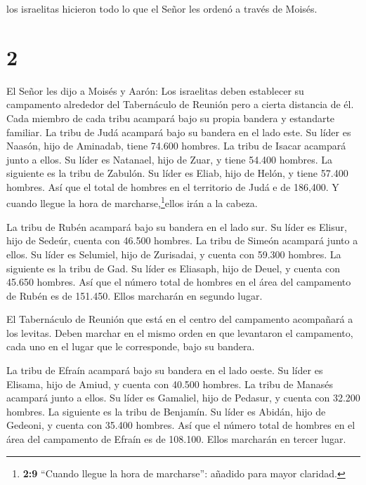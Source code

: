  los israelitas hicieron todo lo que el Señor les ordenó a
través de Moisés.

\hypertarget{section-1}{%
\section{2}\label{section-1}}

 El Señor les dijo a Moisés y Aarón:  Los
israelitas deben establecer su campamento alrededor del Tabernáculo de
Reunión pero a cierta distancia de él. Cada miembro de cada tribu
acampará bajo su propia bandera y estandarte familiar.  La
tribu de Judá acampará bajo su bandera en el lado este. Su líder es
Naasón, hijo de Aminadab,  tiene 74.600 hombres.
 La tribu de Isacar acampará junto a ellos. Su líder es
Natanael, hijo de Zuar,  y tiene 54.400 hombres.
 La siguiente es la tribu de Zabulón. Su líder es Eliab,
hijo de Helón,  y tiene 57.400 hombres.  Así que
el total de hombres en el territorio de Judá e de 186,400. Y cuando
llegue la hora de marcharse,\footnote{\textbf{2:9} ``Cuando llegue la
  hora de marcharse'': añadido para mayor claridad.}ellos irán a la
cabeza.

 La tribu de Rubén acampará bajo su bandera en el lado sur.
Su líder es Elisur, hijo de Sedeúr,  cuenta con 46.500
hombres.  La tribu de Simeón acampará junto a ellos. Su
líder es Selumiel, hijo de Zurisadai,  y cuenta con 59.300
hombres.  La siguiente es la tribu de Gad. Su líder es
Eliasaph, hijo de Deuel,  y cuenta con 45.650 hombres.
 Así que el número total de hombres en el área del
campamento de Rubén es de 151.450. Ellos marcharán en segundo lugar.

 El Tabernáculo de Reunión que está en el centro del
campamento acompañará a los levitas. Deben marchar en el mismo orden en
que levantaron el campamento, cada uno en el lugar que le corresponde,
bajo su bandera.

 La tribu de Efraín acampará bajo su bandera en el lado
oeste. Su líder es Elisama, hijo de Amiud,  y cuenta con
40.500 hombres.  La tribu de Manasés acampará junto a
ellos. Su líder es Gamaliel, hijo de Pedasur,  y cuenta con
32.200 hombres.  La siguiente es la tribu de Benjamín. Su
líder es Abidán, hijo de Gedeoni,  y cuenta con 35.400
hombres.  Así que el número total de hombres en el área del
campamento de Efraín es de 108.100. Ellos marcharán en tercer lugar.

